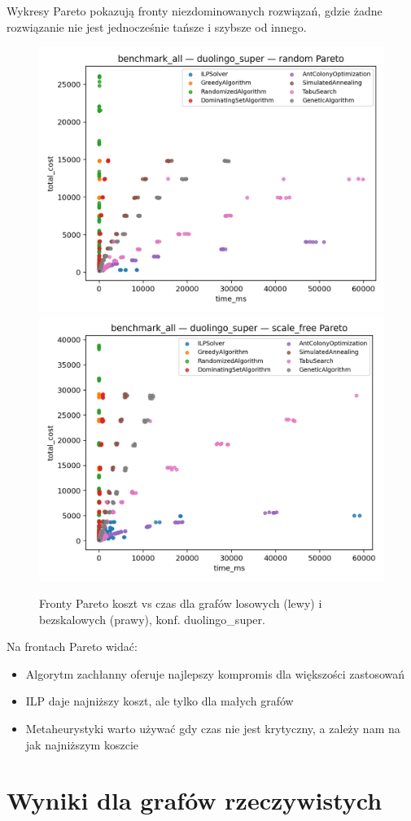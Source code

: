 Wykresy Pareto pokazują fronty niezdominowanych rozwiązań, gdzie żadne rozwiązanie nie jest jednocześnie tańsze i szybsze od innego.

\begin{figure}[H]
  \centering
  \includegraphics[width=0.48\linewidth]{assets/figures/ba_random_duo_pareto.png}
  \includegraphics[width=0.48\linewidth]{assets/figures/ba_scale_free_duo_pareto.png}
  \caption{Fronty Pareto koszt vs czas dla grafów losowych (lewy) i bezskalowych (prawy), konf. duolingo\_super.}
  \label{fig:pareto_analysis}
\end{figure}

Na frontach Pareto widać:
\begin{itemize}
  \item Algorytm zachłanny oferuje najlepszy kompromis dla większości zastosowań
  \item ILP daje najniższy koszt, ale tylko dla małych grafów
  \item Metaheurystyki warto używać gdy czas nie jest krytyczny, a zależy nam na jak najniższym koszcie
\end{itemize}

\section{Wyniki dla grafów rzeczywistych}

